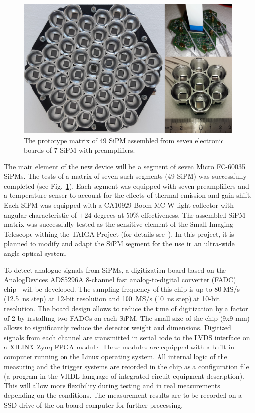 \documentclass[a4paper,11pt]{article}
\begin{document}
\begin{figure}[t]
\centering %
\includegraphics[width=.55\textwidth]{mosaic_protype.png}
\caption{The prototype matrix of 49 SiPM assembled from seven electronic boards of 7 SiPM with preamplifiers.}
\label{fig:mosaic49_7}
\end{figure}

The main element of the new device will be a segment of seven Micro FC-60035 SiPMs. The tests of a matrix of seven such segments (49 SiPM) was successfully completed (see Fig.~\ref{fig:mosaic49_7}). Each segment was equipped with seven preamplifiers and a temperature sensor to account for the effects of thermal emission and gain shift. Each SiPM was equipped with a CA10929 Boom-MC-W light collector with angular characteristic of $\pm$24 degrees at 50\% effectiveness. The assembled SiPM matrix was successfully tested as the sensitive element of the Small Imaging Telescope withing the TAIGA Project (for details see~\cite{SIT20}). In this project, it is planned to modify and adapt the SiPM segment for the use in an ultra-wide angle optical system.

To detect analogue signals from SiPMs, a digitization board based on the AnalogDevices \href{https://www.ti.com/product/ADS5296A}{ADS5296A} 8-channel fast analog-to-digital converter (FADC) chip~\cite{FADC} will be developed. The sampling frequency of this chip is up to 80 MS/s (12.5~ns step) at 12-bit resolution and 100~MS/s (10~ns step) at 10-bit resolution.
The board design allows to reduce the time of digitization by a factor of 2 by installing two FADCs on each SiPM.
The small size of the chip (9x9 mm) allows to significantly reduce the detector weight and dimensions. 
Digitized signals from each channel are transmitted in serial code to the LVDS interface on a XILINX Zynq FPGA module.
These modules are equipped with a built-in computer running on the Linux operating system.
All internal logic of the measuring and the trigger systems are recorded in the chip as a configuration file (a program in the VHDL language of integrated circuit equipment description). This will allow more flexibility during testing and in real measurements depending on the conditions.
The measurement results are to be recorded on a SSD drive of the on-board computer for further processing.
\end{document}
